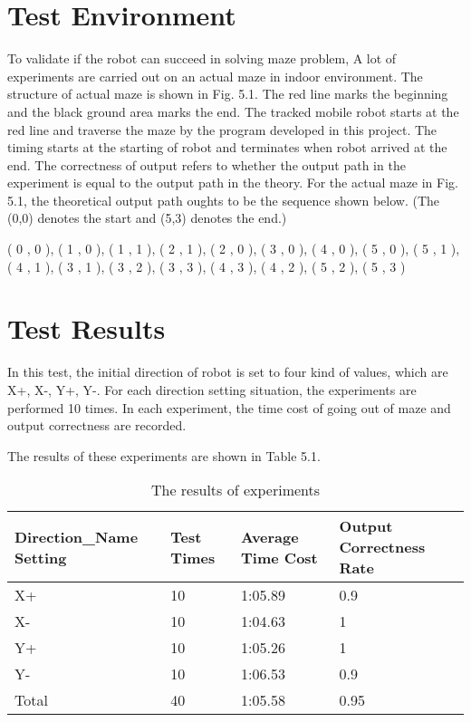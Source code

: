 \documentclass[11pt,times,oneside,openright,hardcopy]{eeereport}
\begin{document}
\section{Test Environment}
To validate if the robot can succeed in solving maze problem, A lot of experiments are carried out on an actual maze in indoor environment.
The structure of actual maze is shown in Fig. 5.1.
The red line marks the beginning and the black ground area marks the end.
The tracked mobile robot starts at the red line and traverse the maze by the program developed in this project.
The timing starts at the starting of robot and terminates when robot arrived at the end.
The correctness of output refers to whether the output path in the experiment is equal to the output path in the theory.
For the actual maze in Fig. 5.1, the theoretical output path oughts to be the sequence shown below. (The (0,0) denotes the start and (5,3) denotes the end.)

( 0  ,  0 ), ( 1  ,  0 ), ( 1  ,  1 ), ( 2  ,  1 ), ( 2  ,  0 ), ( 3  ,  0 ), ( 4  ,  0 ), ( 5  ,  0 ), ( 5  ,  1 ),
( 4  ,  1 ), ( 3  ,  1 ), ( 3  ,  2 ), ( 3  ,  3 ), ( 4  ,  3 ), ( 4  ,  2 ), ( 5  ,  2 ), ( 5  ,  3 )  

\section{Test Results}
In this test, the initial direction of robot is set to four kind of values, which are X+, X-, Y+, Y-.
For each direction setting situation, the experiments are performed 10 times.
In each experiment, the time cost of going out of maze and output correctness are recorded. 

The results of these experiments are shown in Table 5.1.
\begin{table}[h]
    \label{tab:tab1}
    \centering
    \caption{The results of experiments}
    \renewcommand{\arraystretch}{2}
    \setlength{\tabcolsep}{10pt}
    \begin{tabular}{ | m{4cm} | m{2cm} | m{3cm} | m{3cm} |} 
    \hline Direction\_Name Setting & Test Times & Average Time Cost & Output Correctness Rate \\
    \hline X+ & 10 & 1:05.89 & 0.9 \\ 
    \hline X- & 10 & 1:04.63 & 1 \\ 
    \hline Y+ & 10 & 1:05.26 & 1 \\
    \hline Y- & 10 & 1:06.53 & 0.9 \\ 
    \hline Total & 40 & 1:05.58 & 0.95 \\ 
    \hline  
    \end{tabular} 
    \end{table}
\end{document}

